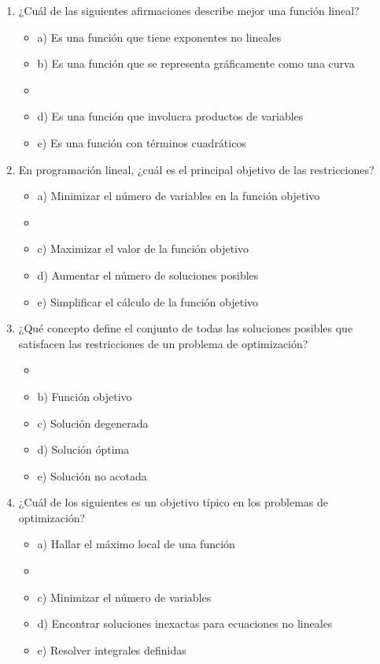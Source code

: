 \documentclass[a4paper,10pt]{article}
\begin{document}
\begin{enumerate}
    \item ¿Cuál de las siguientes afirmaciones describe mejor una función lineal?
    \begin{itemize}
        \item a) Es una función que tiene exponentes no lineales
        \item b) Es una función que se representa gráficamente como una curva
        \item {}
        \item d) Es una función que involucra productos de variables
        \item e) Es una función con términos cuadráticos
    \end{itemize}

    \item En programación lineal, ¿cuál es el principal objetivo de las restricciones?
    \begin{itemize}
        \item a) Minimizar el número de variables en la función objetivo
        \item {}
        \item c) Maximizar el valor de la función objetivo
        \item d) Aumentar el número de soluciones posibles
        \item e) Simplificar el cálculo de la función objetivo
    \end{itemize}

    \item ¿Qué concepto define el conjunto de todas las soluciones posibles que satisfacen las restricciones de un problema de optimización?
    \begin{itemize}
        \item {}
        \item b) Función objetivo
        \item c) Solución degenerada
        \item d) Solución óptima
        \item e) Solución no acotada
    \end{itemize}

    \item ¿Cuál de los siguientes es un objetivo típico en los problemas de optimización?
    \begin{itemize}
        \item a) Hallar el máximo local de una función
        \item {}
        \item c) Minimizar el número de variables
        \item d) Encontrar soluciones inexactas para ecuaciones no lineales
        \item e) Resolver integrales definidas
    \end{itemize}


\end{enumerate}
\end{document}
